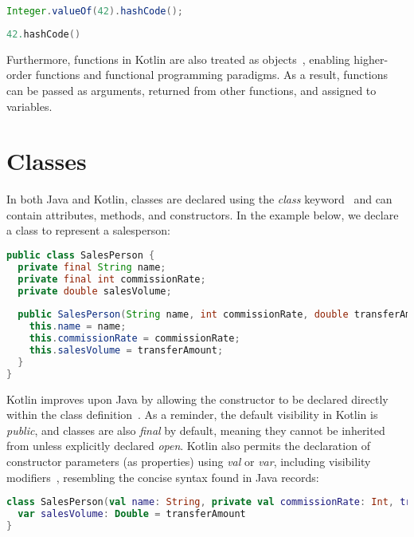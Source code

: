\documentclass[a4paper,11pt]{article}
\begin{document}
\begin{lstlisting}[language=Java, title={Java Integer Wrapper}]
Integer.valueOf(42).hashCode();
\end{lstlisting}

\begin{lstlisting}[language=Kotlin, title={Kotlin direct usage of Int}]
42.hashCode()
\end{lstlisting}

Furthermore, functions in Kotlin are also treated as objects~\cite{higher-order-functions}, enabling higher-order functions and functional programming paradigms. As a result, functions can be passed as arguments, returned from other functions, and assigned to variables.

\section{Classes}
In both Java and Kotlin, classes are declared using the \textit{class} keyword~\cite{classes} and can contain attributes, methods, and constructors. In the example below, we declare a class to represent a salesperson:

\begin{lstlisting}[language=Java, title={Java Class Declaration}]
public class SalesPerson {
  private final String name;
  private final int commissionRate;
  private double salesVolume;
  
  public SalesPerson(String name, int commissionRate, double transferAmount) {
    this.name = name;
    this.commissionRate = commissionRate;
    this.salesVolume = transferAmount;
  }
}
\end{lstlisting}

Kotlin improves upon Java by allowing the constructor to be declared directly within the class definition~\cite{classes-constructors}. As a reminder, the default visibility in Kotlin is \textit{public}, and classes are also \textit{final} by default, meaning they cannot be inherited from unless explicitly declared \textit{open}. Kotlin also permits the declaration of constructor parameters (as properties) using \textit{val} or \textit{var}, including visibility modifiers~\cite{classes-constructors}, resembling the concise syntax found in Java records:

\begin{lstlisting}[language=Kotlin,title={Kotlin Class Declaration}]
class SalesPerson(val name: String, private val commissionRate: Int, transferAmount: Double = 0.0) {
  var salesVolume: Double = transferAmount
}
\end{lstlisting}
\end{document}
